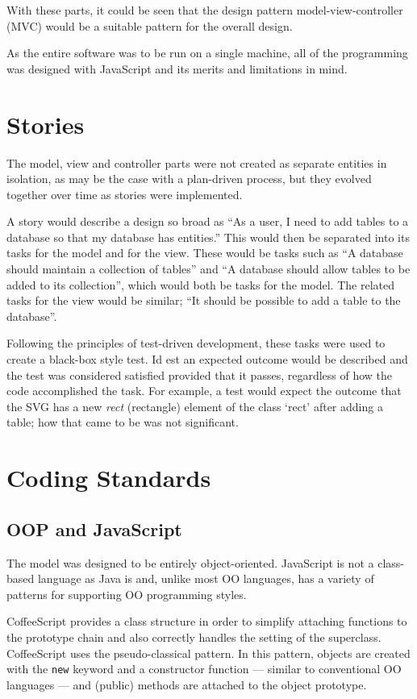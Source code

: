 With these parts, it could be seen that the design pattern model-view-controller (MVC) would be a suitable pattern for the overall design.

As the entire software was to be run on a single machine, all of the programming was designed with Java\-Script and its merits and limitations in mind.

\section{Stories}
The model, view and controller parts were not created as separate entities in isolation, as may be the case with a plan-driven process, but they evolved together over time as stories were implemented.

A story would describe a design so broad as ``As a user, I need to add tables to a database so that my database has entities.'' This would then be separated into its tasks for the model and for the view. These would be tasks such as ``A database should maintain a collection of tables'' and ``A database should allow tables to be added to its collection'', which would both be tasks for the model. The related tasks for the view would be similar; ``It should be possible to add a table to the database''.

Following the principles of test-driven development, these tasks were used to create a black-box style test. Id est an expected outcome would be described and the test was considered satisfied provided that it passes, regardless of how the code accomplished the task. For example, a test would expect the outcome that the SVG has a new \emph{rect} (rectangle) element of the class `rect' after adding a table; how that came to be was not significant.

\section{Coding Standards}
\subsection{OOP and JavaScript}
The model was designed to be entirely object-oriented. Java\-Script is not a class-based language as Java is and, unlike most OO languages, has a variety of patterns for supporting OO programming styles.

CoffeeScript provides a class structure in order to simplify attaching functions to the prototype chain and also correctly handles the setting of the superclass. Coffee\-Script uses the pseudo-classical pattern. In this pattern, objects are created with the \texttt{new} keyword and a constructor function --- similar to conventional OO languages --- and (public) methods are attached to the object prototype.

